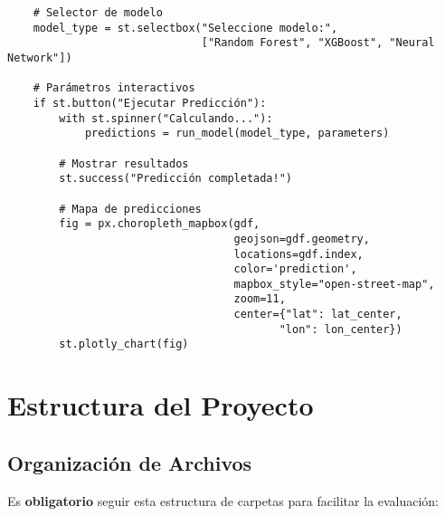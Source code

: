 \documentclass[12pt,a4paper]{article}
\begin{document}
\begin{verbatim}
    # Selector de modelo
    model_type = st.selectbox("Seleccione modelo:",
                              ["Random Forest", "XGBoost", "Neural Network"])

    # Parámetros interactivos
    if st.button("Ejecutar Predicción"):
        with st.spinner("Calculando..."):
            predictions = run_model(model_type, parameters)

        # Mostrar resultados
        st.success("Predicción completada!")

        # Mapa de predicciones
        fig = px.choropleth_mapbox(gdf,
                                   geojson=gdf.geometry,
                                   locations=gdf.index,
                                   color='prediction',
                                   mapbox_style="open-street-map",
                                   zoom=11,
                                   center={"lat": lat_center,
                                          "lon": lon_center})
        st.plotly_chart(fig)
\end{verbatim}

\section{Estructura del Proyecto}

\subsection{Organización de Archivos}

\begin{alertbox}
Es \textbf{obligatorio} seguir esta estructura de carpetas para facilitar la evaluación:
\end{alertbox}
\end{document}
